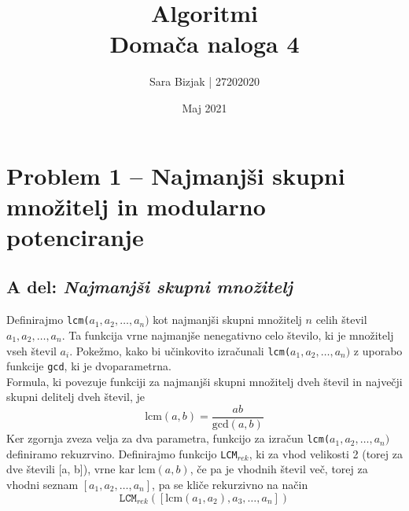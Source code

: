\documentclass[a4paper,11pt]{article}
\title{Algoritmi \\
\textbf{Domača naloga 4} }
\author{Sara Bizjak  |  27202020}
\date{Maj 2021}
\begin{document}
\maketitle


\section*{Problem 1 -- Najmanjši skupni množitelj in modularno potenciranje}

\subsection*{A del: \textit{Najmanjši skupni množitelj}}

Definirajmo \texttt{lcm($a_1, a_2, \ldots, a_n)$} kot najmanjši skupni množitelj $n$ celih števil $a_1, a_2, \ldots, a_n$. Ta funkcija vrne najmanjše nenegativno celo število, ki je množitelj vseh števil $a_i$. 
Pokežmo, kako bi učinkovito izračunali  \texttt{lcm($a_1, a_2, \ldots, a_n)$}  z uporabo funkcije \texttt{gcd}, ki je dvoparametrna.
\\
Formula, ki povezuje funkciji za najmanjši skupni množitelj dveh števil in največji skupni delitelj dveh števil, je
$$
\text{lcm}(a, b) = \frac{ab}{\text{gcd}(a, b)}
$$
Ker zgornja zveza velja za dva parametra, funkcijo za izračun \texttt{lcm($a_1, a_2, \ldots, a_n)$} definiramo rekuzrvino. 
Definirajmo funkcijo \texttt{LCM$_{rek}$}, ki za vhod velikosti 2 (torej za dve števili [a, b]), vrne kar $\text{lcm}(a, b)$, če pa je vhodnih števil več, torej za vhodni seznam $[a_1, a_2, \ldots, a_n]$, pa se kliče rekurzivno na način
$$
\texttt{LCM$_{rek}$}([\text{lcm}(a_1, a_2), a_3, \ldots, a_n])
$$
\end{document}
